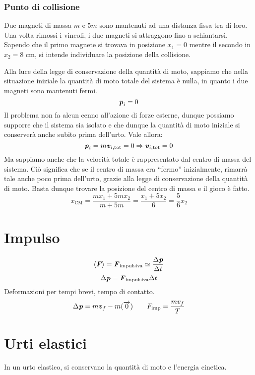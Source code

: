 \subsubsection*{Punto di collisione}
Due magneti di massa $m$ e $5m$ sono mantenuti ad una distanza fissa tra
di loro. Una volta rimossi i vincoli, i due magneti si attraggono fino a
schiantarsi. Sapendo che il primo magnete si trovava in posizione $x_1 = 0$
mentre il secondo in $x_2 = 8\text{ cm}$, si intende individuare la posizione
della collisione.

Alla luce della legge di conservazione della quantità di moto, sappiamo
che nella situazione iniziale la quantità di moto totale del sistema è
nulla, in quanto i due magneti sono mantenuti fermi.
\[ \textbf{\textit{p}}_i = 0 \]
Il problema non fa alcun cenno all'azione di forze esterne, dunque possiamo
supporre che il sistema sia isolato e che dunque la quantità di moto
iniziale si conserverà anche subito prima dell'urto. Vale allora:
\[ \textbf{\textit{p}}_i = m\textbf{\textit{v}}_{i,\text{tot}} = 0 \Rightarrow \textbf{\textit{v}}_{i,\text{tot}} = 0 \]
Ma sappiamo anche che la velocità totale è rappresentato dal centro di massa
del sistema. Ciò significa che se il centro di massa era ``fermo''
inizialmente, rimarrà tale anche poco prima dell'urto, grazie alla legge
di conservazione della quantità di moto. Basta dunque trovare la posizione
del centro di massa e il gioco è fatto.
\[ x_\text{CM} = \frac{mx_1 + 5mx_2}{m + 5m} = \frac{x_1 + 5x_2}{6} = \frac{5}{6}x_2 \]


\section{Impulso}
\[ \left\langle \textbf{\textit{F}} \right\rangle = \textbf{\textit{F}}_\text{impulsiva} \simeq \frac{\Delta\textbf{\textit{p}}}{\Delta t} \]
\[ \Delta\textbf{\textit{p}} = \textbf{\textit{F}}_\text{impulsiva}\Delta t \]
Deformazioni per tempi brevi, tempo di contatto.
\[ \Delta\textbf{\textit{p}} = m\textbf{\textit{v}}_f - m(\overrightarrow{0}) \qquad F_\text{imp} = \frac{mv_f}{T} \]


\section{Urti elastici}
\begin{tcolorbox}[colback = yellow!30, colframe = yellow!30!black, title = {Urto}]
    In un urto elastico, si conservano la quantità di moto e l'energia cinetica.
\end{tcolorbox}
\vspace{5pt}

